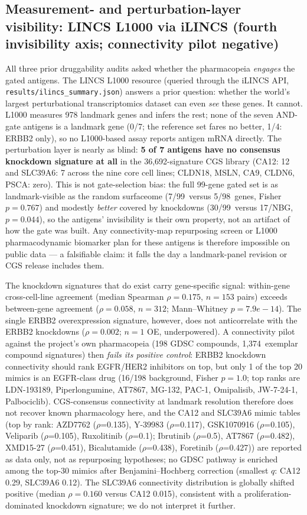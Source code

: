 \subsection{Measurement- and perturbation-layer visibility: LINCS L1000 via iLINCS (fourth invisibility axis; connectivity pilot negative)}
\label{sec:ilincs}
All three prior druggability audits asked whether the pharmacopeia
\emph{engages} the gated antigens. The LINCS L1000 resource (queried through
the iLINCS API, \texttt{results/ilincs\_summary.json}) answers a prior
question: whether the world's largest perturbational transcriptomics dataset
can even \emph{see} these genes. It cannot. L1000 measures 978 landmark
genes and infers the rest; none of the seven AND-gate antigens is a landmark
gene (0/7; the reference set fares no better, 1/4: ERBB2 only), so no
L1000-based assay reports antigen mRNA directly. The perturbation layer is
nearly as blind: \textbf{5 of 7 antigens have no consensus knockdown
signature at all} in the 36,692-signature CGS library (CA12: 12 and
SLC39A6: 7 across the nine core cell lines; CLDN18, MSLN, CA9, CLDN6, PSCA:
zero). This is not gate-selection bias: the full 99-gene gated set is as
landmark-visible as the random surfaceome (7/99\ versus
5/98\ genes, Fisher $p=0.767$) and modestly \emph{better} covered by
knockdowns (30/99\ versus 17/NBG, $p=0.044$), so the antigens'
invisibility is their own property, not an artifact of how the gate was
built. Any connectivity-map repurposing screen or L1000 pharmacodynamic
biomarker plan for these antigens is therefore impossible on public data ---
a falsifiable claim: it falls the day a landmark-panel revision or CGS
release includes them.

The knockdown signatures that do exist carry gene-specific signal:
within-gene cross-cell-line agreement (median Spearman
$\rho=0.175$, $n=153$ pairs) exceeds between-gene agreement
($\rho=0.058$, $n=312$; Mann--Whitney $p=7.9e-14$). The single
ERBB2 overexpression signature, however, does not anticorrelate with the
ERBB2 knockdowns ($\rho=0.002$; $n=1$ OE, underpowered). A connectivity
pilot against the project's own pharmacopeia (198 GDSC compounds, 1,374\
exemplar compound signatures) then \emph{fails its positive control}:
ERBB2 knockdown connectivity should rank EGFR/HER2 inhibitors on top, but
only 1 of the top 20 mimics is an EGFR-class drug (16/198 background,
Fisher $p=1.0$; top ranks are LDN-193189, Piperlongumine, AT7867, MG-132, PAC-1, Omipalisib, JW-7-24-1, Palbociclib). CGS-consensus connectivity at
landmark resolution therefore does not recover known pharmacology here, and
the CA12 and SLC39A6 mimic tables (top by rank: AZD7762 ($\rho$=0.135), Y-39983 ($\rho$=0.117), GSK1070916 ($\rho$=0.105), Veliparib ($\rho$=0.105), Ruxolitinib ($\rho$=0.1); Ibrutinib ($\rho$=0.5), AT7867 ($\rho$=0.482), XMD15-27 ($\rho$=0.451), Bicalutamide ($\rho$=0.438), Foretinib ($\rho$=0.427)) are
reported as data only, not as repurposing hypotheses; no GDSC pathway is
enriched among the top-30 mimics after Benjamini--Hochberg correction
(smallest $q$: CA12 0.29, SLC39A6 0.12). The SLC39A6 connectivity
distribution is globally shifted positive (median $\rho=0.160$ versus
CA12 0.015), consistent with a proliferation-dominated knockdown
signature; we do not interpret it further.

